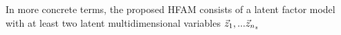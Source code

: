 In more concrete terms, the proposed HFAM consists of a latent factor model with at least two latent multidimensional variables $\vec{z}_1,... \vec{z}_{n_z}$ 